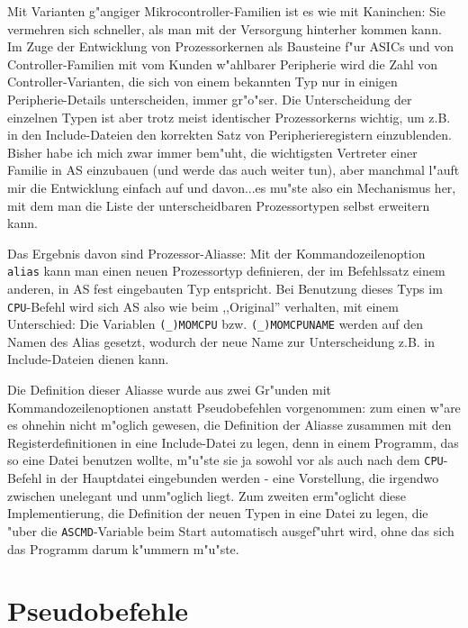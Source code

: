 \documentclass[12pt,a4paper,twoside]{report}
\newcommand{\tty}[1]{{\tt #1}}
\newcommand{\asname}{AS}
\newcommand{\predefsym}[1]{{\tt (\_)#1}}
\begin{document}
Mit Varianten g"angiger Mikrocontroller-Familien ist es wie mit
Kaninchen: Sie vermehren sich schneller, als man mit der Versorgung
hinterher kommen kann.  Im Zuge der Entwicklung von Prozessorkernen als
Bausteine f"ur ASICs und von Controller-Familien mit vom Kunden w"ahlbarer
Peripherie wird die Zahl von Controller-Varianten, die sich von einem
bekannten Typ nur in einigen Peripherie-Details unterscheiden, immer
gr"o"ser.  Die Unterscheidung der einzelnen Typen ist aber trotz meist
identischer Prozessorkerns wichtig, um z.B. in den Include-Dateien den
korrekten Satz von Peripherieregistern einzublenden.  Bisher habe ich
mich zwar immer bem"uht, die wichtigsten Vertreter einer Familie in \asname{}
einzubauen (und werde das auch weiter tun), aber manchmal l"auft mir
die Entwicklung einfach auf und davon...es mu"ste also ein Mechanismus
her, mit dem man die Liste der unterscheidbaren Prozessortypen selbst
erweitern kann.
\par
Das Ergebnis davon sind Prozessor-Aliasse: Mit der Kommandozeilenoption \tty{alias}
kann man einen neuen Prozessortyp definieren, der im Befehlssatz einem
anderen, in \asname{} fest eingebauten Typ entspricht.  Bei Benutzung dieses
Typs im \tty{CPU}-Befehl wird sich \asname{} also wie beim ,,Original'' verhalten,
mit einem Unterschied: Die Variablen \predefsym{MOMCPU} bzw. \predefsym{MOMCPUNAME}
werden auf den Namen des Alias gesetzt, wodurch der neue Name zur
Unterscheidung z.B. in Include-Dateien dienen kann.
\par
Die Definition dieser Aliasse wurde aus zwei Gr"unden mit
Kommandozeilenoptionen anstatt Pseudobefehlen vorgenommen: zum einen
w"are es ohnehin nicht m"oglich gewesen, die Definition der Aliasse
zusammen mit den Registerdefinitionen in eine Include-Datei zu legen, denn
in einem Programm, das so eine Datei benutzen wollte, m"u"ste sie ja sowohl
vor als auch nach dem \tty{CPU}-Befehl in der Hauptdatei eingebunden
werden - eine Vorstellung, die irgendwo zwischen unelegant und unm"oglich
liegt.  Zum zweiten erm"oglicht diese Implementierung, die Definition der
neuen Typen in eine Datei zu legen, die "uber die \tty{ASCMD}-Variable beim
Start automatisch ausgef"uhrt wird, ohne das sich das Programm darum
k"ummern m"u"ste.


\cleardoublepage
\chapter{Pseudobefehle}
\end{document}
